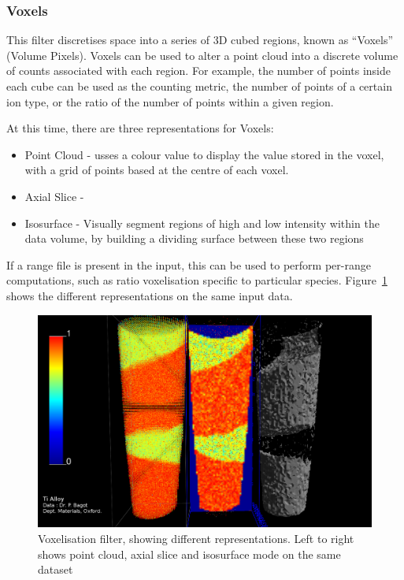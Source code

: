 \documentclass[10pt]{article}
\begin{document}
\FloatBarrier
\subsubsection{Voxels}

This filter discretises space into a series of 3D cubed regions, known as ``Voxels'' (Volume Pixels). Voxels can be used to alter a point cloud into a discrete volume of counts associated with each region. For example, the number of points inside each cube can be used as the counting metric, the number of points of a certain ion type, or the ratio of the number of points within a given region.

At this time, there are three representations for Voxels:
\begin{itemize}
 \item Point Cloud - usses a colour value to display the value stored in the voxel, with a grid of points based at the centre of each voxel.
 \item Axial Slice - 
 \item Isosurface - Visually segment regions of high and low intensity within the data volume, by building a dividing surface between these two regions
\end{itemize}

If a range file is present in the input, this can be used to perform per-range computations, such as ratio voxelisation specific to particular species. Figure~\ref{fig:voxeliseDisplayType} shows the different representations on the same input data.

\begin{figure}
 \centering
  \includegraphics[keepaspectratio=true,width=0.9 \textwidth]{./figures/voxel-representations.png}

 \caption{Voxelisation filter, showing different representations. Left to right shows point cloud, axial slice and isosurface mode on the same dataset}
 \label{fig:voxeliseDisplayType}
\end{figure}
\end{document}
